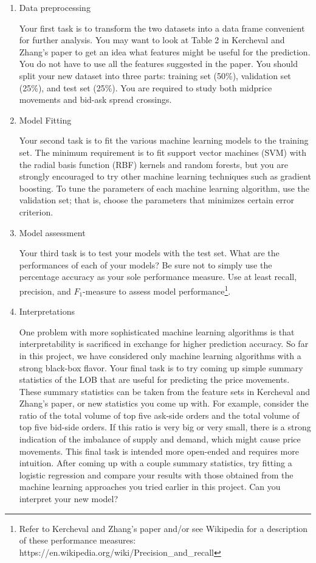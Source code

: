 \documentclass[11pt, oneside]{article}   	%
\begin{document}
\begin{enumerate}
\item Data preprocessing

Your first task is to transform the two datasets into a data frame convenient for 
further analysis. You may want to look at Table 2 in Kercheval and Zhang's paper 
to get an idea what features might be useful for the prediction. You do not have 
to use all the features suggested in the paper. You should split your new dataset 
into three parts: training set (50\%), validation set (25\%), and test set (25\%). 
You are required to study both midprice movements and bid-ask spread crossings.

\item Model Fitting

Your second task is to fit the various machine learning models to the training set. 
The minimum requirement is to fit support vector machines (SVM) with the radial 
basis function (RBF) kernels and random forests, but you are strongly encouraged 
to try other machine learning techniques such as gradient boosting. To tune the 
parameters of each machine learning algorithm, use the validation set; that is, 
choose the parameters that minimizes certain error criterion.

\item Model assessment

Your third task is to test your models with the test set. What are the performances 
of each of your models? Be sure not to simply use the percentage accuracy as your sole
performance measure. Use at least recall, precision, and $F_1$-measure to assess model 
performance\footnote{Refer to Kercheval and Zhang's paper and/or see Wikipedia for a description of these performance measures: https://en.wikipedia.org/wiki/Precision\_and\_recall}.

\item Interpretations

One problem with more sophisticated machine learning algorithms is that interpretability is sacrificed in exchange for higher prediction accuracy. So far in this project, we have considered only machine learning algorithms with a strong black-box flavor. Your final task is to try coming up simple summary statistics of the LOB that are useful for predicting the price movements. These summary statistics can be taken from the feature sets in Kercheval and Zhang's paper, or new statistics you come up with. For example, consider the ratio of the total volume of top five ask-side orders and the total volume of top five bid-side orders. If this ratio is very big or very small, there is a strong indication of the imbalance of supply and demand, which might cause price movements. This final task is intended more open-ended and requires more intuition. After coming up with a couple summary statistics, try fitting a logistic regression and compare your results with those obtained from the machine learning approaches you tried earlier in this project. Can you interpret your new model?

\end{enumerate}
\end{document}
